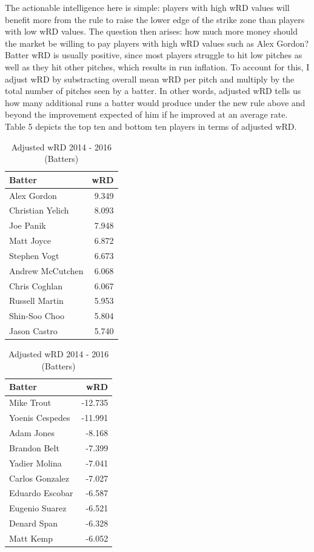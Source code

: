 \documentclass[11pt]{article}
\begin{document}
The actionable intelligence here is simple: players with high wRD values will benefit more from the rule to raise the lower edge of the strike zone than players with low wRD values.  The question then arises: how much more money should the market be willing to pay players with high wRD values such as Alex Gordon?  Batter wRD is usually positive, since most players struggle to hit low pitches as well as they hit other pitches, which results in run inflation.  To account for this, I adjust wRD by substracting overall mean wRD per pitch and multiply by the total number of pitches seen by a batter.  In other words, adjusted wRD tells us how many additional runs a batter would produce under the new rule above and beyond the improvement expected of him if he improved at an average rate.  Table 5 depicts the top ten and bottom ten players in terms of adjusted wRD.

\begin{table}[ht]
\centering
\begin{tabular}{lr}
  \hline
Batter & wRD \\ 
  \hline
Alex Gordon & 9.349 \\ 
  Christian Yelich & 8.093 \\ 
  Joe Panik & 7.948 \\ 
  Matt Joyce & 6.872 \\ 
  Stephen Vogt & 6.673 \\ 
  Andrew McCutchen & 6.068 \\ 
  Chris Coghlan & 6.067 \\ 
  Russell Martin & 5.953 \\ 
  Shin-Soo Choo & 5.804 \\ 
  Jason Castro & 5.740 \\ 
   \hline
\end{tabular}
\quad
\begin{tabular}{lr}
  \hline
Batter & wRD \\ 
  \hline
Mike Trout & -12.735 \\ 
  Yoenis Cespedes & -11.991 \\ 
  Adam Jones & -8.168 \\ 
  Brandon Belt & -7.399 \\ 
  Yadier Molina & -7.041 \\ 
  Carlos Gonzalez & -7.027 \\ 
  Eduardo Escobar & -6.587 \\ 
  Eugenio Suarez & -6.521 \\ 
  Denard Span & -6.328 \\ 
  Matt Kemp & -6.052 \\ 
   \hline
\end{tabular}
\caption{Adjusted wRD 2014 - 2016 (Batters)}
\end{table}
\end{document}
